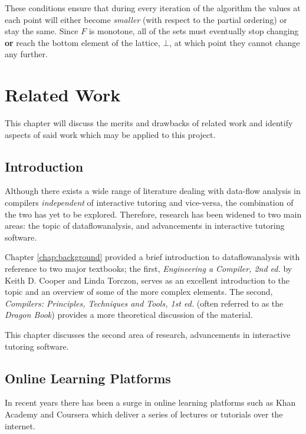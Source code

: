 \documentclass[bsc,twoside,singlespacing,parskip,logo,notimes,normalheadings]{infthesis}
\begin{document}
        These conditions ensure that during every iteration of the
        algorithm the values at each point will either become {\em
          smaller} (with respect to the partial ordering) or stay the
        same. Since $F$ is monotone, all of the sets must eventually
        stop changing {\bf or} reach the bottom element of the
        lattice, $\bot$, at which point they cannot change any
        further.


\chapter{Related Work}\label{chap:relatedwork}
This chapter will discuss the merits and drawbacks of related work and
identify aspects of said work which may be applied to this project.

    \section{Introduction}

    Although there exists a wide range of literature dealing with
    data-flow analysis in compilers {\em independent} of interactive
    tutoring and vice-versa, the combination of the two has yet to be
    explored. Therefore, research has been widened to two main areas:
    the topic of \gls{dataflowanalysis}, and advancements in
    interactive tutoring software.
    
    Chapter \ref{chap:background} provided a brief introduction to
    \gls{dataflowanalysis} with reference to two major textbooks; the
    first, {\em Engineering a Compiler, 2nd ed.}\cite{eac} by Keith
    D. Cooper and Linda Torczon, serves as an excellent introduction
    to the topic and an overview of some of the more complex
    elements. The second, {\em Compilers: Principles, Techniques and
      Tools, 1st ed.}\cite{dragonbook} (often referred to as the {\em
      Dragon Book}) provides a more theoretical discussion of the
    material.
    
    This chapter discusses the second area of research, advancements
    in interactive tutoring software.

    \section{Online Learning Platforms}

    In recent years there has been a surge in online learning
    platforms such as Khan Academy and Coursera which deliver a series
    of lectures or tutorials over the internet.
\end{document}
